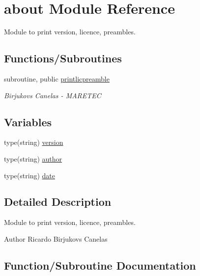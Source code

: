 \hypertarget{namespaceabout}{}\section{about Module Reference}
\label{namespaceabout}


Module to print version, licence, preambles.  


\subsection*{Functions/\+Subroutines}
\begin{DoxyCompactItemize}
\item 
subroutine, public \hyperlink{namespaceabout_aca93132913ea2de3a9eb9aa3d1c0ec9c}{printlicpreamble}
\begin{DoxyCompactList}\small\item\em Birjukovs Canelas -\/ M\+A\+R\+E\+T\+EC \end{DoxyCompactList}\end{DoxyCompactItemize}
\subsection*{Variables}
\begin{DoxyCompactItemize}
\item 
type(string) \hyperlink{namespaceabout_a14ee014ae64ebcd65e04112f51ca7911}{version}
\item 
type(string) \hyperlink{namespaceabout_a157e082adf984f1d88804d2f8217a632}{author}
\item 
type(string) \hyperlink{namespaceabout_a24578effbdb161e41c0b52f50e7e3ffc}{date}
\end{DoxyCompactItemize}


\subsection{Detailed Description}
Module to print version, licence, preambles. 

\begin{DoxyAuthor}{Author}
Ricardo Birjukovs Canelas 
\end{DoxyAuthor}


\subsection{Function/\+Subroutine Documentation}
\mbox{\label{namespaceabout_aca93132913ea2de3a9eb9aa3d1c0ec9c}} 
